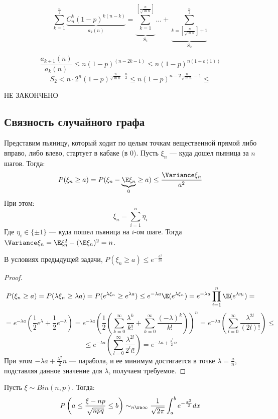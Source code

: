 
\[\sum_{k=1}^\frac{n}{2} \underbrace{C_n^k (1-p)^{k(n-k)}}_{a_k(n)} = \underbrace{\sum_{k=1}^{[\frac{n}{\sqrt{\ln{n}}}]}}_{S_1} \dots + \underbrace{\sum_{k = [\frac{n}{\sqrt{\ln{n}}}] + 1}^{\frac{n}{2}}}_{S_2}\]

\[\frac{a_{k+1}(n)}{a_k(n)} \le n (1-p)^{(n-2k-1)} \le n(1-p)^{n(1 + o(1))}\]
\[S_2 < n \cdot 2^n (1 - p)^{\frac{n}{\sqrt{\ln{n}}} \cdot \frac{n}{2}} \le n(1 - p)^{n - 2\frac{n}{\sqrt{\ln{n}}} - 1}  \le \]

НЕ ЗАКОНЧЕНО

\subsection{Связность случайного графа}

Представим пьяницу, который ходит по целым точкам вещественной прямой либо вправо, либо влево, стартует в кабаке (в 0). Пусть \(\xi_n\) --- куда дошел пьяница за \(n\) шагов. Тогда:
\[P(\xi_n \ge a) = P(\xi_n - \underbrace{\E \xi_n}_{0} \ge a) \le \frac{\Variance \xi_n}{a^2}\]
При этом:
\[\xi_n = \sum_{i = 1}^n \eta_i\]
Где \(\eta_i \in \{\pm 1\}\) --- куда пошел пьяница на \(i\)-ом шаге. Тогда \(\Variance \xi_n = \E\xi_n^2 - (\E\xi_n)^2 = n\).

\begin{proposition}
    В условиях предыдущей задачи, \(P(\xi_n \ge a) \le e^{-\frac{a^2}{2n}}\)
\end{proposition}
\begin{proof}
    \[P(\xi_n \ge a) = P(\lambda\xi_n \ge \lambda a) = P(e^{\lambda \xi_n} \ge e^{\lambda a}) \le e^{-\lambda a}\E (e^{\lambda \xi_n}) = e^{-\lambda a} \prod_{i = 1}^n \E (e^{\lambda \eta_i}) = \]
    \[= e^{-\lambda a} \left( \frac{1}{2}e^\lambda + \frac{1}{2}e^{-\lambda} \right) = e^{-\lambda a}\left( \frac{1}{2}\left( \sum_{k = 0}^\infty \frac{\lambda^k}{k!} + \sum_{k = 0}^\infty \frac{(-\lambda)^k}{k!} \right) \right)^n = e^{-\lambda a} \left( \sum_{l = 0}^\infty \frac{\lambda^{2l}}{(2l)!} \right) \le \]
    \[\le e^{-\lambda a} \left( \sum_{l = 0}^\infty \frac{\lambda^{2l}}{2^ll!} \right) = e^{-\lambda a + \frac{\lambda^2}{2}n}\]
    При этом \(-\lambda a + \frac{\lambda^2}{2}n\) --- парабола, и ее минимум достигается в точке \(\lambda = \frac{a}{n}\), подставляя данное значение для \(\lambda\), получаем требуемое.
\end{proof}

\begin{theorem}
    Пусть \(\xi \sim Bin(n, p)\). Тогда:
    \[P\left( a \le \frac{\xi - n p}{\sqrt{npq}} \le b\right) \sim_{n \ra \infty} \frac{1}{\sqrt{2\pi}} \int_a^b e^{-\frac{x^2}{2}}dx\]
\end{theorem}


